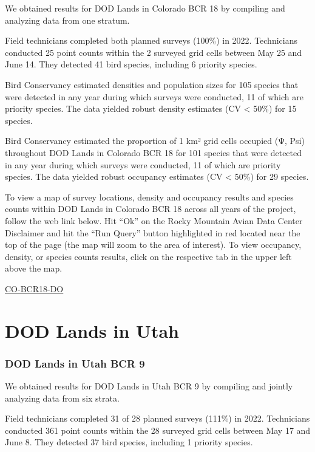\documentclass[
  letterpaper,
  DIV=11,
  numbers=noendperiod,
  oneside]{scrreprt}
\begin{document}
We obtained results for DOD Lands in Colorado BCR 18 by compiling and
analyzing data from one stratum.

Field technicians completed both planned surveys (100\%) in 2022.
Technicians conducted 25 point counts within the 2 surveyed grid cells
between May 25 and June 14. They detected 41 bird species, including 6
priority species.

Bird Conservancy estimated densities and population sizes for 105
species that were detected in any year during which surveys were
conducted, 11 of which are priority species. The data yielded robust
density estimates (CV \textless{} 50\%) for 15 species.

Bird Conservancy estimated the proportion of 1 km² grid cells occupied
(Ψ, Psi) throughout DOD Lands in Colorado BCR 18 for 101 species that
were detected in any year during which surveys were conducted, 11 of
which are priority species. The data yielded robust occupancy estimates
(CV \textless{} 50\%) for 29 species.

To view a map of survey locations, density and occupancy results and
species counts within DOD Lands in Colorado BCR 18 across all years of
the project, follow the web link below. Hit ``Ok'' on the Rocky Mountain
Avian Data Center Disclaimer and hit the ``Run Query'' button
highlighted in red located near the top of the page (the map will zoom
to the area of interest). To view occupancy, density, or species counts
results, click on the respective tab in the upper left above the map.

\href{http://www.rmbo.org/new_site/adc/QueryWindow.aspx\#N4IgzgLgTghhCuBbEAuABCAwgeQLQCFMAlARgA5cARbdSgUwAcYoJE6A7CNAewDM16vDmDogAvkA}{CO-BCR18-DO}

\hypertarget{dod-lands-in-utah}{%
\section{DOD Lands in Utah}\label{dod-lands-in-utah}}

\hypertarget{dod-lands-in-utah-bcr-9}{%
\subsubsection{DOD Lands in Utah BCR 9}\label{dod-lands-in-utah-bcr-9}}

We obtained results for DOD Lands in Utah BCR 9 by compiling and jointly
analyzing data from six strata.

Field technicians completed 31 of 28 planned surveys (111\%) in 2022.
Technicians conducted 361 point counts within the 28 surveyed grid cells
between May 17 and June 8. They detected 37 bird species, including 1
priority species.
\end{document}

